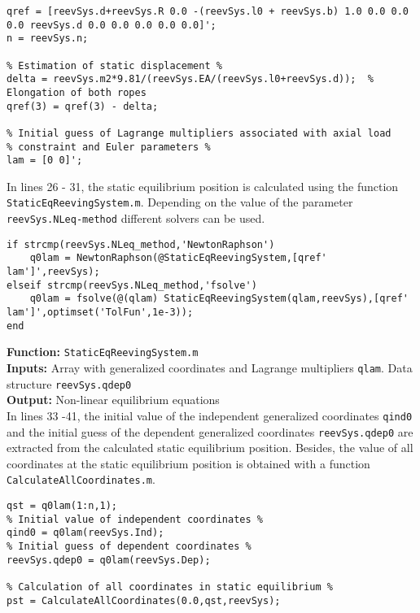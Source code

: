 {\begin{tcolorbox}\begin{lstlisting}[style=Matlab-editor]
% Reference value of coordinates (undeformed configuration) %
qref = [reevSys.d+reevSys.R 0.0 -(reevSys.l0 + reevSys.b) 1.0 0.0 0.0 0.0 reevSys.d 0.0 0.0 0.0 0.0 0.0]';
n = reevSys.n;

% Estimation of static displacement %
delta = reevSys.m2*9.81/(reevSys.EA/(reevSys.l0+reevSys.d));  % Elongation of both ropes
qref(3) = qref(3) - delta;  

% Initial guess of Lagrange multipliers associated with axial load
% constraint and Euler parameters %
lam = [0 0]';
\end{lstlisting}\end{tcolorbox}}


In lines 26 - 31, the static equilibrium position is calculated using the function \texttt{StaticEqReevingSystem.m}. Depending on the value of the parameter \texttt{reevSys.NLeq-method} different solvers can be used.

{\begin{tcolorbox}\begin{lstlisting}[style=Matlab-editor]
% Calculation of static equilibrium position %
if strcmp(reevSys.NLeq_method,'NewtonRaphson')
    q0lam = NewtonRaphson(@StaticEqReevingSystem,[qref' lam']',reevSys);
elseif strcmp(reevSys.NLeq_method,'fsolve')
    q0lam = fsolve(@(qlam) StaticEqReevingSystem(qlam,reevSys),[qref' lam']',optimset('TolFun',1e-3));
end
\end{lstlisting}\end{tcolorbox}}


\setlength{\parindent}{0cm}
\textbf{Function:} \texttt{StaticEqReevingSystem.m} \\
\textbf{Inputs:} Array with generalized coordinates and Lagrange multipliers \texttt{qlam}. Data structure \texttt{reevSys.qdep0} \\
\textbf{Output:} Non-linear equilibrium equations \\

In lines 33 -41, the initial value of the independent generalized coordinates \texttt{qind0} and the initial guess of the dependent generalized coordinates \texttt{reevSys.qdep0} are extracted from the calculated static equilibrium position. Besides, the value of all coordinates at the static equilibrium position is obtained with a function \texttt{CalculateAllCoordinates.m}.

{\begin{tcolorbox}\begin{lstlisting}[style=Matlab-editor]
% Generalized coordinates in static equilibrium %
qst = q0lam(1:n,1);
% Initial value of independent coordinates %
qind0 = q0lam(reevSys.Ind);
% Initial guess of dependent coordinates %
reevSys.qdep0 = q0lam(reevSys.Dep);

% Calculation of all coordinates in static equilibrium %
pst = CalculateAllCoordinates(0.0,qst,reevSys);
\end{lstlisting}\end{tcolorbox}}



